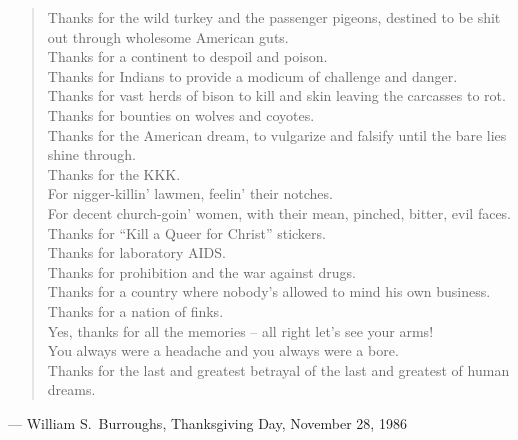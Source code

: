 
\begin{verse}
Thanks for the wild turkey and the passenger pigeons, destined to be shit out through wholesome American guts. 
\\
Thanks for a continent to despoil and poison. 
\\
Thanks for Indians to provide a modicum of challenge and danger. 
\\
Thanks for vast herds of bison to kill and skin leaving the carcasses to rot.
\\
Thanks for bounties on wolves and coyotes. 
\\
Thanks for the American dream, to vulgarize and falsify until the bare lies shine through. 
\\
Thanks for the KKK. 
\\
For nigger-killin' lawmen, feelin' their notches. 
\\
For decent church-goin' women, with their mean, pinched, bitter, evil faces. 
\\
Thanks for ``Kill a Queer for Christ'' stickers. 
\\
Thanks for laboratory AIDS. 
\\
Thanks for prohibition and the war against drugs. 
\\
Thanks for a country where nobody's allowed to mind his own business. 
\\
Thanks for a nation of finks. 
\\
Yes, thanks for all the memories -- all right let's see your arms! 
\\
You always were a headache and you always were a bore. 
\\
Thanks for the last and greatest betrayal of the last and greatest of human dreams. 
\end{verse}

\hfill{--- William S.\ Burroughs, Thanksgiving Day, November 28, 1986}
